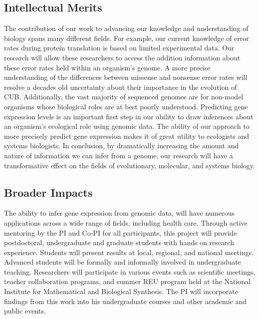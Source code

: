 \documentclass[11pt,fleqn]{article}
\begin{document}
\subsection*{Intellectual Merits}
The contribution of our work to advancing our knowledge and understanding of biology spans many different fields.
For example, our current knowledge of error rates during protein translation is based on limited experimental data.%
Our research will allow these researchers to access the addition information about these error rates held within an organism's genome.
A more precise understanding of the differences between missense and nonsense error rates will resolve a decades old uncertainty about their importance in the evolution of CUB.
Additionally, the vast majority of sequenced genomes are for non-model organisms whose biological roles are at best poorly understood.
Predicting gene expression levels is an important first step in our ability to draw inferences about an organism's ecological role using genomic data.
The ability of our approach to more precisely predict gene expression makes it of great utility to ecologists and systems biologists.
In conclusion, by dramatically increasing the amount and nature of information we can infer from a genome, our research will have a transformative effect on the fields of evolutionary, molecular, and systems biology.


\subsection*{Broader Impacts}
The ability to infer gene expression from genomic data, will have numerous applications across a wide range of fields, including health care.
Through active mentoring by the PI and Co-PI for all participants, this project will provide postdoctoral, undergraduate and graduate students with hands on research experience.
Students will present results at local, regional, and national meetings.
Advanced students will be formally and informally involved in undergraduate teaching. 
Researchers will participate in various events such as scientific meetings, teacher collaboration programs, and summer REU program held at the National Institute for Mathematical and Biological Synthesis.
The PI will incorporate findings from this work into his undergraduate courses and other academic and public events.
\end{document}
